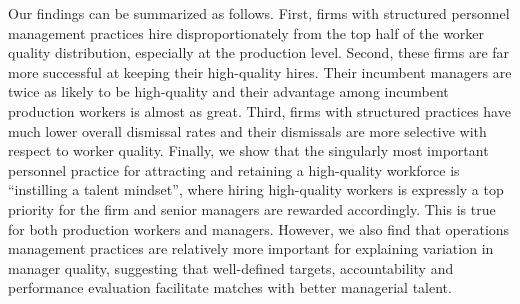 Our findings can be summarized as follows. First, firms with structured personnel management practices hire disproportionately from the top half of the worker quality distribution, especially at the production level. Second, these firms are far more successful at keeping their high-quality hires. Their incumbent managers are twice as likely to be high-quality and their advantage among incumbent production workers is almost as great. Third, firms with structured practices have much lower overall dismissal rates and their dismissals are more selective with respect to worker quality.  Finally, we show that the singularly most important personnel practice for attracting and retaining a high-quality workforce is ``instilling a talent mindset'', where hiring high-quality workers is expressly a top priority for the firm and senior managers are rewarded accordingly.  This is true for both production workers and managers. However, we also find that operations management practices are relatively more important for explaining variation in manager quality, suggesting that well-defined targets, accountability and performance evaluation facilitate matches with better managerial talent.  



